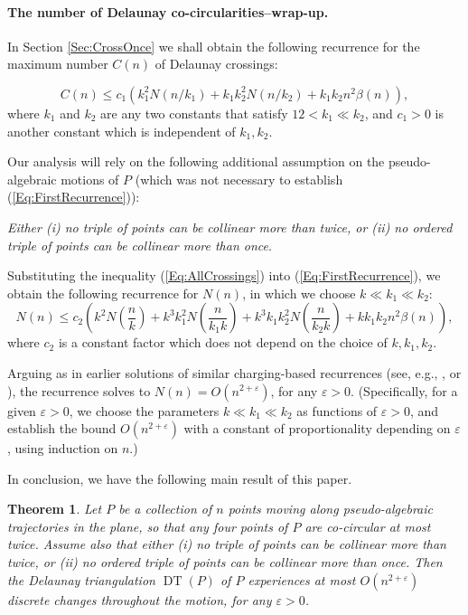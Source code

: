 \documentclass[letter,11pt]{article}
\newtheorem{theorem}{Theorem}[section]
\def\eps{{\varepsilon}}
\def\eps{{\varepsilon}}
\def\DT{\mathop{\mathrm{DT}}}
\begin{document}
\paragraph{The number of Delaunay co-circularities--wrap-up.}
In Section \ref{Sec:CrossOnce} we shall obtain the following recurrence for the maximum number $C(n)$ of Delaunay crossings:


\begin{equation}\label{Eq:AllCrossings}
C(n)\leq c_1\left(k_1^2 N(n/k_1)+k_1 k_2^2 N(n/k_2)+k_1k_2n^2\beta(n)\right), 
\end{equation}
where $k_1$ and $k_2$ are any two constants that satisfy $12<k_1\ll k_2$, and
$c_1>0$ is another constant which is independent of $k_1,k_2$.

Our analysis will rely on the following additional assumption on the pseudo-algebraic motions of $P$ (which was not necessary to establish (\ref{Eq:FirstRecurrence})):

\smallskip
{\it Either (i) no triple of points can be collinear more than twice, or (ii) no ordered triple of points can be collinear more than once}. 

\smallskip
Substituting the inequality (\ref{Eq:AllCrossings}) into (\ref{Eq:FirstRecurrence}), we obtain the following recurrence for $N(n)$, in which we choose $k\ll k_1\ll k_2$: 
\begin{equation}\label{Eq:FinalRecurrence}
N(n)\leq c_2\left(k^2 N\left(\frac{n}{k}\right)+k^3 k_1^2N\left(\frac{n}{k_1k}\right)+k^3k_1k_2^2N\left(\frac{n}{k_2k}\right)+kk_1k_2n^2\beta(n)\right),
\end{equation}
where $c_2$ is a constant factor which does not depend on the choice of $k,k_1,k_2$.

Arguing as in earlier solutions of similar charging-based recurrences (see, e.g., \cite{Envelopes3D,ConstantLines}, or \cite[Section 7.3.2]{SA95}), the recurrence solves to
$N(n)=O(n^{2+\eps})$, for any $\eps>0$. (Specifically, for a given $\eps>0$, we choose the parameters $k\ll k_1\ll k_2$ as functions of $\eps>0$, and establish the bound $O(n^{2+\eps})$ with a constant of proportionality depending on $\eps$, using induction on $n$.) 

In conclusion, we have the following main result of this paper.

\begin{theorem}\label{Thm:OverallBound}
Let $P$ be a collection of $n$ points moving along pseudo-algebraic trajectories in the plane, so that any four points of $P$ are co-circular at most twice. Assume also that either (i) no triple of points can be collinear more than twice, or (ii) no {\it ordered} triple of points can be collinear more than once. Then the Delaunay triangulation $\DT(P)$ of $P$ experiences at most $O(n^{2+\eps})$ discrete changes throughout the motion, for any $\eps>0$.
\end{theorem}
\end{document}
